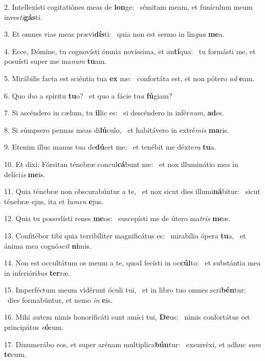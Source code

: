 2. Intellexísti cogitatiónes meas de \textbf{lon}ge: \ast\  sémitam meam, et funículum meum inves\textit{ti}\textbf{gás}ti.\

3. Et omnes vias meas prævi\textbf{dís}ti: \ast\  quia non est sermo in lin\textit{gua} \textbf{me}a.\

4. Ecce, Dómine, tu cognovísti ómnia novíssima, et an\textbf{tí}qua: \ast\  tu formásti me, et posuísti super me ma\textit{num} \textbf{tu}am.\

5. Mirábilis facta est sciéntia tua \textbf{ex} me: \ast\  confortáta est, et non pótero \textit{ad} \textbf{e}am.\

6. Quo ibo a spíritu \textbf{tu}o? \ast\  et quo a fácie tu\textit{a} \textbf{fú}giam?\

7. Si ascéndero in cælum, tu \textbf{il}lic es: \ast\  si descéndero in infér\textit{num}, \textbf{ad}es.\

8. Si súmpsero pennas meas di\textbf{lú}culo, \ast\  et habitávero in extré\textit{mis} \textbf{ma}ris.\

9. Etenim illuc manus tua de\textbf{dú}cet me: \ast\  et tenébit me déxte\textit{ra} \textbf{tu}a.\

10. Et dixi: Fórsitan ténebræ concul\textbf{cá}bunt me: \ast\  et nox illuminátio mea in delíci\textit{is} \textbf{me}is.\

11. Quia ténebræ non obscurabúntur a te, \dag\  et nox sicut dies illumi\textbf{ná}bitur: \ast\  sicut ténebræ ejus, ita et lu\textit{men} \textbf{e}jus.\

12. Quia tu possedísti renes \textbf{me}os: \ast\  suscepísti me de útero ma\textit{tris} \textbf{me}æ.\

13. Confitébor tibi quia terribíliter magnificátus es: \dag\  mirabília ópera \textbf{tu}a, \ast\  et ánima mea cognó\textit{scit} \textbf{ni}mis.\

14. Non est occultátum os meum a te, quod fecísti in oc\textbf{cúl}to: \ast\  et substántia mea in inferióri\textit{bus} \textbf{ter}ræ.\

15. Imperféctum meum vidérunt óculi tui, \dag\  et in libro tuo omnes scri\textbf{bén}tur: \ast\  dies formabúntur, et nemo \textit{in} \textbf{e}is.\

16. Mihi autem nimis honorificáti sunt amíci tui, \textbf{De}us: \ast\  nimis confortátus est principátus \textit{e}\textbf{ó}rum.\

17. Dinumerábo eos, et super arénam multiplica\textbf{bún}tur: \ast\  exsurréxi, et adhuc \textit{sum} \textbf{te}cum.\

